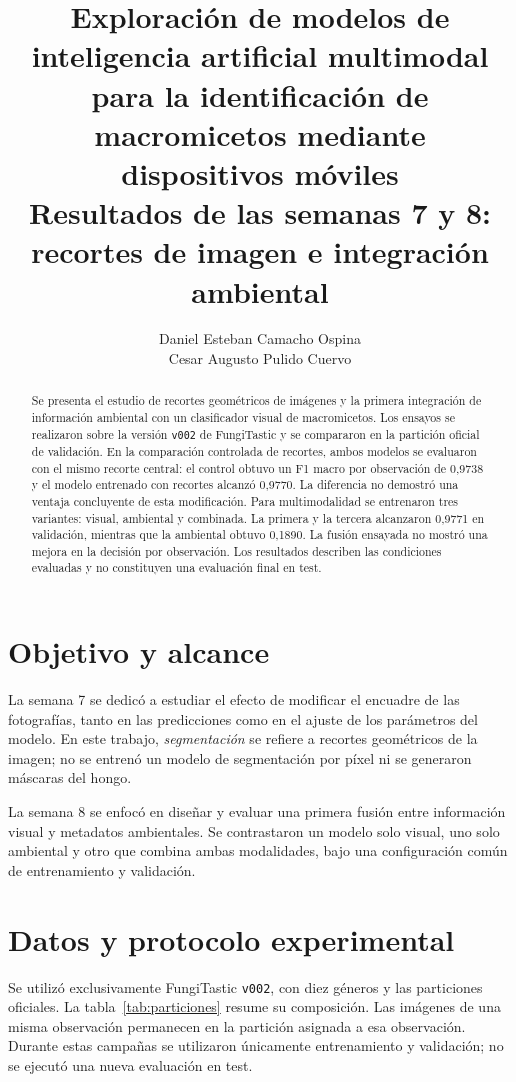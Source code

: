 \documentclass[11pt,a4paper]{article}
\title{\textbf{Exploración de modelos de inteligencia artificial multimodal\\
para la identificación de macromicetos mediante dispositivos móviles}\\[0.6em]
\normalsize Resultados de las semanas 7 y 8: recortes de imagen e integración ambiental}
\author{Daniel Esteban Camacho Ospina\\Cesar Augusto Pulido Cuervo}
\date{}
\begin{document}
\maketitle

\begin{abstract}
Se presenta el estudio de recortes geométricos de imágenes y la primera
integración de información ambiental con un clasificador visual de
macromicetos. Los ensayos se realizaron sobre la versión \texttt{v002} de
FungiTastic y se compararon en la partición oficial de validación. En la
comparación controlada de recortes, ambos modelos se evaluaron con el mismo
recorte central: el control obtuvo un F1 macro por observación de 0,9738 y el
modelo entrenado con recortes alcanzó 0,9770. La diferencia no demostró una
ventaja concluyente de esta modificación. Para multimodalidad se
entrenaron tres variantes: visual, ambiental y combinada. La primera y la
tercera alcanzaron 0,9771 en validación, mientras que la ambiental obtuvo
0,1890. La fusión ensayada no mostró una mejora en la decisión por observación.
Los resultados describen las condiciones evaluadas y no constituyen una
evaluación final en test.
\end{abstract}

\section{Objetivo y alcance}
La semana 7 se dedicó a estudiar el efecto de modificar el encuadre de las
fotografías, tanto en las predicciones como en el ajuste de los parámetros del
modelo. En este trabajo, \emph{segmentación} se refiere a recortes geométricos
de la imagen; no se entrenó un modelo de segmentación por píxel ni se generaron
máscaras del hongo.

La semana 8 se enfocó en diseñar y evaluar una primera fusión entre información
visual y metadatos ambientales. Se contrastaron un modelo solo visual, uno
solo ambiental y otro que combina ambas modalidades, bajo una configuración
común de entrenamiento y validación.

\section{Datos y protocolo experimental}
Se utilizó exclusivamente FungiTastic \texttt{v002}, con diez géneros y las
particiones oficiales. La tabla~\ref{tab:particiones} resume su composición.
Las imágenes de una misma observación permanecen en la partición asignada a
esa observación. Durante estas campañas se utilizaron únicamente entrenamiento
y validación; no se ejecutó una nueva evaluación en test.
\end{document}
